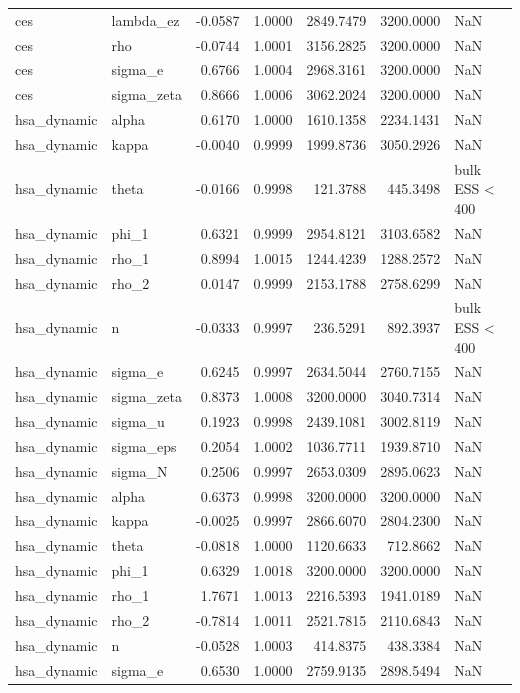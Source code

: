 \begin{tabular}{llrrrrl}
ces & lambda\_ez & -0.0587 & 1.0000 & 2849.7479 & 3200.0000 & NaN \\
ces & rho & -0.0744 & 1.0001 & 3156.2825 & 3200.0000 & NaN \\
ces & sigma\_e & 0.6766 & 1.0004 & 2968.3161 & 3200.0000 & NaN \\
ces & sigma\_zeta & 0.8666 & 1.0006 & 3062.2024 & 3200.0000 & NaN \\
hsa\_dynamic & alpha & 0.6170 & 1.0000 & 1610.1358 & 2234.1431 & NaN \\
hsa\_dynamic & kappa & -0.0040 & 0.9999 & 1999.8736 & 3050.2926 & NaN \\
hsa\_dynamic & theta & -0.0166 & 0.9998 & 121.3788 & 445.3498 & bulk ESS < 400 \\
hsa\_dynamic & phi\_1 & 0.6321 & 0.9999 & 2954.8121 & 3103.6582 & NaN \\
hsa\_dynamic & rho\_1 & 0.8994 & 1.0015 & 1244.4239 & 1288.2572 & NaN \\
hsa\_dynamic & rho\_2 & 0.0147 & 0.9999 & 2153.1788 & 2758.6299 & NaN \\
hsa\_dynamic & n & -0.0333 & 0.9997 & 236.5291 & 892.3937 & bulk ESS < 400 \\
hsa\_dynamic & sigma\_e & 0.6245 & 0.9997 & 2634.5044 & 2760.7155 & NaN \\
hsa\_dynamic & sigma\_zeta & 0.8373 & 1.0008 & 3200.0000 & 3040.7314 & NaN \\
hsa\_dynamic & sigma\_u & 0.1923 & 0.9998 & 2439.1081 & 3002.8119 & NaN \\
hsa\_dynamic & sigma\_eps & 0.2054 & 1.0002 & 1036.7711 & 1939.8710 & NaN \\
hsa\_dynamic & sigma\_N & 0.2506 & 0.9997 & 2653.0309 & 2895.0623 & NaN \\
hsa\_dynamic & alpha & 0.6373 & 0.9998 & 3200.0000 & 3200.0000 & NaN \\
hsa\_dynamic & kappa & -0.0025 & 0.9997 & 2866.6070 & 2804.2300 & NaN \\
hsa\_dynamic & theta & -0.0818 & 1.0000 & 1120.6633 & 712.8662 & NaN \\
hsa\_dynamic & phi\_1 & 0.6329 & 1.0018 & 3200.0000 & 3200.0000 & NaN \\
hsa\_dynamic & rho\_1 & 1.7671 & 1.0013 & 2216.5393 & 1941.0189 & NaN \\
hsa\_dynamic & rho\_2 & -0.7814 & 1.0011 & 2521.7815 & 2110.6843 & NaN \\
hsa\_dynamic & n & -0.0528 & 1.0003 & 414.8375 & 438.3384 & NaN \\
hsa\_dynamic & sigma\_e & 0.6530 & 1.0000 & 2759.9135 & 2898.5494 & NaN \\

\end{tabular}
